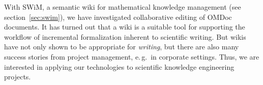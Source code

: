 With SWiM, a semantic wiki for mathematical knowledge management (see
section~\ref{sec:swim}), we have investigated collaborative editing of OMDoc
documents.  It has turned out that a wiki is a suitable tool for supporting the
workflow of incremental formalization inherent to scientific writing.  But wikis
have not only shown to be appropriate for \emph{writing}, but there are also
many success stories from project management, e.\,g.\ in corporate
settings\cite{leuf01:wikiway,wikinomics}.  Thus, we are interested in applying
our technologies to scientific knowledge engineering projects.

